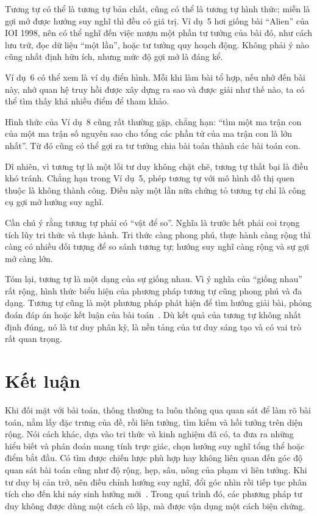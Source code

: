 \documentclass[11pt]{article}
\begin{document}
Tương tự có thể là tương tự bản chất, cũng có thể là tương tự hình thức; miễn
là gợi mở được hướng suy nghĩ thì đều có giá trị. Ví dụ~5 hơi giống bài
``Alien'' của IOI 1998, nên có thể nghĩ đến việc mượn một phần tư tưởng của
bài đó, như cách lưu trữ, đọc dữ liệu ``một lần'', hoặc tư tưởng quy hoạch
động. Không phải ý nào cũng nhất định hữu ích, nhưng mức độ gợi mở là đáng kể.

Ví dụ~6 có thể xem là ví dụ điển hình. Mỗi khi làm bài tổ hợp, nếu nhớ đến bài
này, nhớ quan hệ truy hồi được xây dựng ra sao và được giải như thế nào, ta có
thể tìm thấy khá nhiều điểm để tham khảo.

Hình thức của Ví dụ~8 cũng rất thường gặp, chẳng hạn: ``tìm một ma trận con
của một ma trận số nguyên sao cho tổng các phần tử của ma trận con là lớn
nhất''. Từ đó cũng có thể gợi ra tư tưởng chia bài toán thành các bài toán con.

Dĩ nhiên, vì tương tự là một lối tư duy không chặt chẽ, tương tự thất bại là
điều khó tránh. Chẳng hạn trong Ví dụ~5, phép tương tự với mô hình đồ thị quen
thuộc là không thành công. Điều này một lần nữa chứng tỏ tương tự chỉ là công
cụ gợi mở hướng suy nghĩ.

Cần chú ý rằng tương tự phải có ``vật để so''. Nghĩa là trước hết phải coi
trọng tích lũy tri thức và thực hành. Tri thức càng phong phú, thực hành càng
rộng thì càng có nhiều đối tượng để so sánh tương tự; hướng suy nghĩ càng rộng
và sự gợi mở càng lớn.

Tóm lại, tương tự là một dạng của sự giống nhau. Vì ý nghĩa của ``giống nhau''
rất rộng, hình thức biểu hiện của phương pháp tương tự cũng phong phú và đa
dạng. Tương tự cũng là một phương pháp phát hiện để tìm hướng giải bài, phỏng
đoán đáp án hoặc kết luận của bài toán~\cite{math-thinking}. Dù kết quả của
tương tự không nhất định đúng, nó là tư duy phân kỳ, là nền tảng của tư duy
sáng tạo và có vai trò rất quan trọng.

\section{Kết luận}

Khi đối mặt với bài toán, thông thường ta luôn thông qua quan sát để làm rõ
bài toán, nắm lấy đặc trưng của đề, rồi liên tưởng, tìm kiếm và hồi tưởng trên
diện rộng. Nói cách khác, dựa vào tri thức và kinh nghiệm đã có, ta đưa ra
những hiểu biết và phán đoán mang tính trực giác, chọn hướng suy nghĩ tổng thể
hoặc điểm bắt đầu. Có tìm được chiến lược phù hợp hay không liên quan đến góc
độ quan sát bài toán cũng như độ rộng, hẹp, sâu, nông của phạm vi liên tưởng.
Khi tư duy bị cản trở, nên điều chỉnh hướng suy nghĩ, đổi góc nhìn rồi tiếp
tục phân tích cho đến khi nảy sinh hướng mới~\cite{math-thinking}. Trong quá
trình đó, các phương pháp tư duy không được dùng một cách cô lập, mà được vận
dụng một cách biện chứng.
\end{document}
